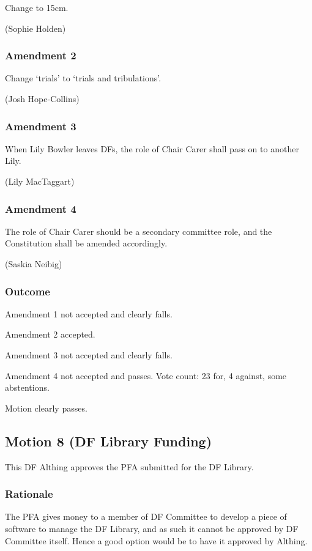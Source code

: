 \documentclass[a4paper, 11pt]{article} %
\begin{document}
Change to 15cm.

(Sophie Holden)

\subsubsection{Amendment 2}

Change `trials' to `trials and tribulations'.

(Josh Hope-Collins)

\subsubsection{Amendment 3}

When Lily Bowler leaves DFs, the role of Chair Carer shall pass on to another Lily.

(Lily MacTaggart)

\subsubsection{Amendment 4}

The role of Chair Carer should be a secondary committee role, and the Constitution shall be amended accordingly.

(Saskia Neibig)

\subsubsection{Outcome}

Amendment 1 not accepted and clearly falls.

Amendment 2 accepted.

Amendment 3 not accepted and clearly falls.

Amendment 4 not accepted and passes. Vote count: 23 for, 4 against, some abstentions.

Motion clearly passes.

\subsection{Motion 8 (DF Library Funding)}

This DF Althing approves the PFA submitted for the DF Library.

\subsubsection{Rationale}

The PFA gives money to a member of DF Committee to develop a piece of software to manage the DF Library, and as such it cannot be approved by DF Committee itself.  Hence a good option would be to have it approved by Althing.
\end{document}
